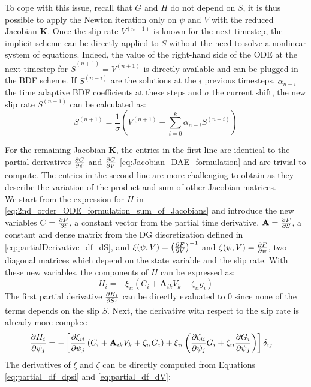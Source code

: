 To cope with this issue, recall that $G$ and $H$ do not depend on $S$, it is thus possible to apply the Newton iteration only on $\psi$ and $V$ with the reduced Jacobian $\mathbf{K}$. Once the slip rate $V^{(n+1)}$ is known for the next timestep, the implicit scheme can be directly applied to $S$ without the need to solve a nonlinear system of equations. Indeed, the value of the right-hand side of the ODE at the next timestep for $\dot{S}^{(n+1)} = V^{(n+1)}$ is directly available and can be plugged in the BDF scheme. If $S^{(n-i)}$ are the solutions at the $i$ previous timesteps, $\alpha_{n-i}$ the time adaptive BDF coefficients at these steps and $\sigma$ the current shift, the new slip rate $S^{(n+1)}$ can be calculated as: 
\begin{equation}
	\label{eq:update_S_2ndOrderODE}
	S^{(n+1)} = \frac{1}{\sigma}\left(V^{(n+1)} - \sum_{i=0}^{k}\alpha_{n-i}S^{(n-i)}\right)
\end{equation}

For the remaining Jacobian $\mathbf{K}$, the entries in the first line are identical to the partial derivatives $\pdv{G}{\psi}$ and $\pdv{G}{V}$ \autoref{eq:Jacobian_DAE_formulation} and are trivial to compute. The entries in the second line are more challenging to obtain as they describe the variation of the product and sum of other Jacobian matrices. \\

We start from the expression for $H$ in \autoref{eq:2nd_order_ODE_formulation_sum_of_Jacobians} and introduce the new variables $C = \pdv{F}{t}$, a constant vector from the partial time derivative, $\mathbf{A} = \pdv{F}{S}$, a constant and dense matrix from the DG discretization defined in \autoref{eq:partialDerivative_df_dS}, and $\xi(\psi,V) = \left(\pdv{F}{V}\right)^{-1}$ and $\zeta(\psi,V) = \pdv{F}{\psi}$, two diagonal matrices which depend on the state variable and the slip rate. With these new variables, the components of $H$ can be expressed as:
\begin{equation}
	H_i = -\xi_{ii}\left(C_i + \mathbf{A}_{ik}V_k + \zeta_{ii}g_i\right)
\end{equation}
The first partial derivative $\pdv{H_i}{S_j}$ can be directly evaluated to 0 since none of the terms depends on the slip $S$. Next, the derivative with respect to the slip rate is already more complex:
\begin{align}
	\pdv{H_i}{\psi_j} &= -\left[\pdv{\xi_{ii}}{\psi_j}\left(C_i + \mathbf{A}_{ik}V_k + \zeta_{ii}G_i\right) + \xi_{ii}\left(\pdv{\zeta_{ii}}{\psi_j}G_i + \zeta_{ii}\pdv{G_i}{\psi_j}\right)\right]\delta_{ij}
\end{align}
The derivatives of $\xi$ and $\zeta$ can be directly computed from Equations \ref{eq:partial_df_dpsi} and \ref{eq:partial_df_dV}:

